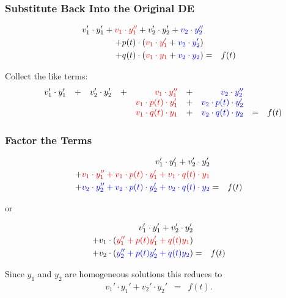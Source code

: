 \begin{frame}
  \frametitle{Substitute Back Into the Original DE}

  \begin{eqnarray*}
      v_1' \cdot y_1' + {\color{red}v_1 \cdot y_1''} + v_2' \cdot y_2' + {\color{blue}v_2 \cdot y_2''} & & \\
    + p(t) \cdot \left( {\color{red}v_1 \cdot y_1'} + {\color{blue}v_2 \cdot y_2'} \right) & & \\
    + q(t) \cdot \left( {\color{red}v_1 \cdot y_1} + {\color{blue}v_2 \cdot y_2} \right) & = & f(t)
  \end{eqnarray*}

  Collect the like terms:
  \begin{eqnarray*}
    \begin{array}{rccccrcrcl}
    & v_1' \cdot y_1' & + & v_2' \cdot y_2'  & + & {\color{red}v_1 \cdot y_1''} & + & {\color{blue}v_2 \cdot y_2''} & & \\
    & & & & & {\color{red}v_1 \cdot p(t) \cdot y_1'} & + & {\color{blue}v_2 \cdot p(t) \cdot y_2'}  & & \\
    & & & & & {\color{red}v_1 \cdot q(t) \cdot y_1}  & + & {\color{blue}v_2 \cdot q(t) \cdot y_2}  & = & f(t)
  \end{array}
  \end{eqnarray*}


\end{frame}


\begin{frame}
  \frametitle{Factor the Terms}

  \begin{eqnarray*}
    v_1' \cdot y_1' + v_2' \cdot y_2'  & & \\
    + {\color{red} v_1 \cdot y_1'' + v_1 \cdot p(t) \cdot y_1' + v_1 \cdot q(t) \cdot y_1} & & \\
    + {\color{blue}v_2 \cdot y_2'' + v_2 \cdot p(t) \cdot y_2' + v_2 \cdot q(t) \cdot y_2} & = & f(t)
  \end{eqnarray*}

  or

  \begin{eqnarray*}
    v_1' \cdot y_1' + v_2' \cdot y_2'  & & \\
    + v_1 \cdot \left(  {\color{red}y_1'' + p(t) y_1' + q(t) y_1} \right) & & \\
    + v_2 \cdot \left( {\color{blue}y_2'' + p(t) y_2' + q(t) y_2} \right) & = & f(t)
  \end{eqnarray*}

  Since $y_1$ and $y_2$ are homogeneous solutions this reduces to
  \begin{eqnarray}
    \label{eqn:secondConstraint}
    v_1' \cdot y_1' + v_2' \cdot y_2'  & = & f(t).
  \end{eqnarray}


\end{frame}


